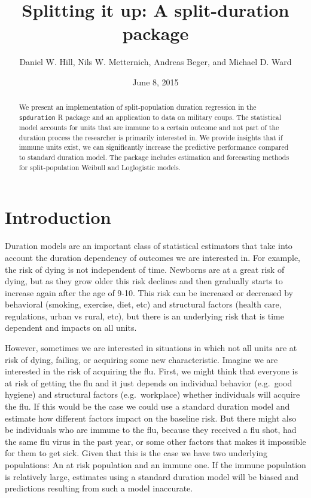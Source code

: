 \documentclass[]{article}
\title{Splitting it up: A split-duration package}
\author{Daniel W. Hill, Nils W. Metternich, Andreas Beger, and Michael D. Ward}
\date{June 8, 2015}
\begin{document}
\maketitle


\begin{abstract}
We present an implementation of split-population duration regression in the \texttt{spduration} R package and an application to data on military coups. The statistical model accounts for units that are immune to a certain outcome and not part of the duration process the researcher is primarily interested in. We provide insights that if immune units exist, we can significantly increase the predictive performance compared to standard duration model. The package includes estimation and forecasting methods for split-population Weibull and Loglogistic models.
\end{abstract}

\section{Introduction}\label{introduction}

Duration models are an important class of statistical estimators that
take into account the duration dependency of outcomes we are interested
in. For example, the risk of dying is not independent of time. Newborns
are at a great risk of dying, but as they grow older this risk declines
and then gradually starts to increase again after the age of 9-10. This
risk can be increased or decreased by behavioral (smoking, exercise,
diet, etc) and structural factors (health care, regulations, urban vs
rural, etc), but there is an underlying risk that is time dependent and
impacts on all units.

However, sometimes we are interested in situations in which not all
units are at risk of dying, failing, or acquiring some new
characteristic. Imagine we are interested in the risk of acquiring the
flu. First, we might think that everyone is at risk of getting the flu
and it just depends on individual behavior (e.g.~good hygiene) and
structural factors (e.g.~workplace) whether individuals will acquire the
flu. If this would be the case we could use a standard duration model
and estimate how different factors impact on the baseline risk. But
there might also be individuals who are immune to the flu, because they
received a flu shot, had the same flu virus in the past year, or some
other factors that makes it impossible for them to get sick. Given that
this is the case we have two underlying populations: An at risk
population and an immune one. If the immune population is relatively
large, estimates using a standard duration model will be biased and
predictions resulting from such a model inaccurate.
\end{document}

